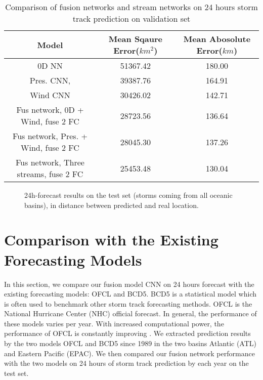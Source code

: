 \begin{table}[]
	\centering
	\caption{Comparison of fusion networks and stream networks on 24 hours storm track prediction on validation set}
	\label{table:fus_compare_}
	\begin{tabular}{|c|c|c|}
		\hline
		Model & Mean Sqaure Error($km^2$) & Mean Abosolute Error($km$) \\ \hline
		0D NN & 51367.42 & 180.00 \\ \hline
		Pres. CNN, & 39387.76 & 164.91 \\ \hline
		Wind CNN & 30426.02 & 142.71 \\ \hline
		Fus network, 0D + Wind, fuse 2 FC  & 28723.56 & 136.64 \\ \hline
		Fus network, Pres. + Wind, fuse 2 FC & 28045.30 & 137.26 \\ \hline
		Fus network, Three streams, fuse 2 FC & 25453.48 & 130.04 \\ \hline
		
		
	\end{tabular}
\end{table}

\begin{figure}
	\begin{center}
		\hsize {}
	\end{center}
	\caption{24h-forecast results on the test set (storms coming from all oceanic basins), in distance between predicted and real location.}
	\label{fig:boxplots}
\end{figure}

\section{Comparison with the Existing Forecasting Models}
In this section, we compare our fusion model CNN on 24 hours forecast with the existing forecasting models: OFCL and BCD5. BCD5 is a statistical model which is often used to benchmark other storm track forecasting methods. OFCL is the National Hurricane Center (NHC) official forecast. In general, the performance of these models varies per year. With increased computational power, the performance of OFCL is constantly improving \cite{hurricane_models}. We extracted prediction results by the two models OFCL and BCD5 since 1989 in the two basins Atlantic (ATL) and Eastern Pacific (EPAC). We then compared our fusion network performance with the two models on 24 hours of storm track prediction by each year on the test set.
